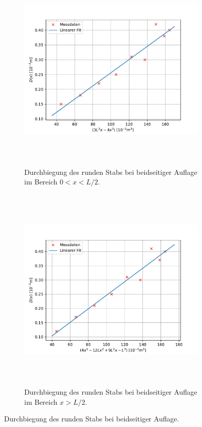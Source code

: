 \begin{figure}[H]
  \begin{subfigure}{\textwidth}
  \centering
  \includegraphics[height=10cm]{content/plots/rundb1.pdf}
  \caption{Durchbiegung des runden Stabs bei beidseitiger Auflage im Bereich $0<x<L/2$.}
  \label{fig:LinRegrundb1}
  \end{subfigure}
  \hfill
  \begin{subfigure}{\textwidth}
  \centering
  \includegraphics[height=10cm]{content/plots/rundb2.pdf}
  \caption{Durchbiegung des runden Stabs bei beidseitiger Auflage im Bereich $x>L/2$.}
  \label{fig:LinRegrundb2}
  \end{subfigure}
  \caption{Durchbiegung des runden Stabs bei beidseitiger Auflage.}
  \label{fig:LinRegrundb}
\end{figure}



